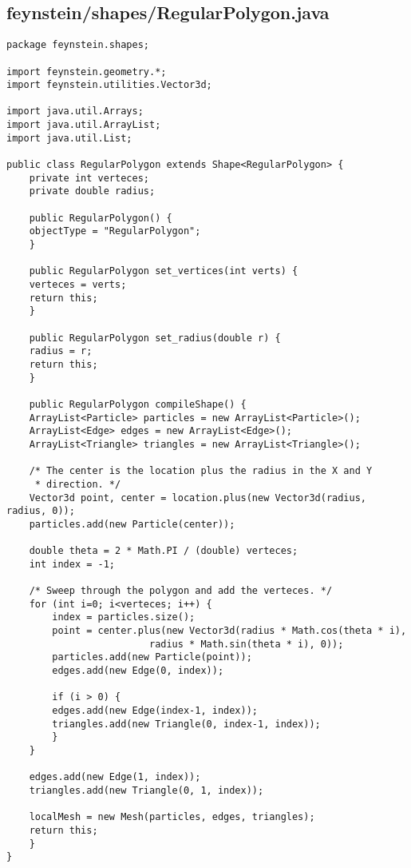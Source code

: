 \subsection*{feynstein/shapes/RegularPolygon.java}
\begin{lstlisting}
package feynstein.shapes;

import feynstein.geometry.*;
import feynstein.utilities.Vector3d;

import java.util.Arrays;
import java.util.ArrayList;
import java.util.List;

public class RegularPolygon extends Shape<RegularPolygon> {
    private int verteces;
    private double radius;

    public RegularPolygon() {
	objectType = "RegularPolygon";
    }

    public RegularPolygon set_vertices(int verts) {
	verteces = verts;
	return this;
    }

    public RegularPolygon set_radius(double r) {
	radius = r;
	return this;
    }

    public RegularPolygon compileShape() {
	ArrayList<Particle> particles = new ArrayList<Particle>();
	ArrayList<Edge> edges = new ArrayList<Edge>();
	ArrayList<Triangle> triangles = new ArrayList<Triangle>();

	/* The center is the location plus the radius in the X and Y
	 * direction. */
	Vector3d point, center = location.plus(new Vector3d(radius, radius, 0));
	particles.add(new Particle(center));

	double theta = 2 * Math.PI / (double) verteces;
	int index = -1;

	/* Sweep through the polygon and add the verteces. */
	for (int i=0; i<verteces; i++) {
	    index = particles.size();
	    point = center.plus(new Vector3d(radius * Math.cos(theta * i),
					     radius * Math.sin(theta * i), 0));
	    particles.add(new Particle(point));
	    edges.add(new Edge(0, index));

	    if (i > 0) {
		edges.add(new Edge(index-1, index));
		triangles.add(new Triangle(0, index-1, index));
	    }
	}
	
	edges.add(new Edge(1, index));
	triangles.add(new Triangle(0, 1, index));

	localMesh = new Mesh(particles, edges, triangles);
	return this;
    }
}\end{lstlisting}

